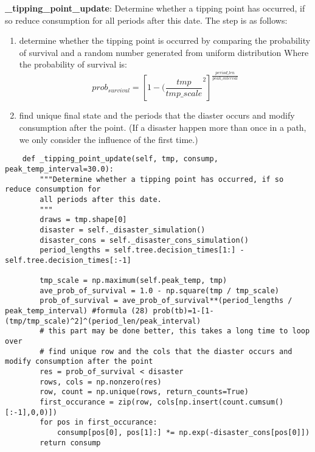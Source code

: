 \documentclass[12pt]{article}
\begin{document}
\textbf{\_tipping\_point\_update}: Determine whether a tipping point has occurred, if so reduce consumption for all periods after this date. The step is as follows:
\begin{enumerate}
  \item determine whether the tipping point is occurred by comparing the probability of survival and a random number generated from uniform distribution  Where the probability of survival is:
  \begin{equation*}
    prob_{survival}=[1-(\frac{tmp}{tmp\_scale}^2]^{\frac{period\_len}{peak\_interval}}
  \end{equation*}
  \item find unique final state and the periods that the diaster occurs and modify consumption after the point. (If a disaster happen more than once in a path, we only consider the influence of the first time.)
\end{enumerate}
\begin{verbatim}
    def _tipping_point_update(self, tmp, consump, peak_temp_interval=30.0):
        """Determine whether a tipping point has occurred, if so reduce consumption for
        all periods after this date.
        """
        draws = tmp.shape[0]
        disaster = self._disaster_simulation()
        disaster_cons = self._disaster_cons_simulation()
        period_lengths = self.tree.decision_times[1:] - self.tree.decision_times[:-1]

        tmp_scale = np.maximum(self.peak_temp, tmp)
        ave_prob_of_survival = 1.0 - np.square(tmp / tmp_scale)
        prob_of_survival = ave_prob_of_survival**(period_lengths / peak_temp_interval) #formula (28) prob(tb)=1-[1-(tmp/tmp_scale)^2]^(period_len/peak_interval)
        # this part may be done better, this takes a long time to loop over
        # find unique row and the cols that the diaster occurs and modify consumption after the point
        res = prob_of_survival < disaster
        rows, cols = np.nonzero(res)
        row, count = np.unique(rows, return_counts=True)
        first_occurance = zip(row, cols[np.insert(count.cumsum()[:-1],0,0)])
        for pos in first_occurance:
            consump[pos[0], pos[1]:] *= np.exp(-disaster_cons[pos[0]])
        return consump
\end{verbatim}
\end{document}
